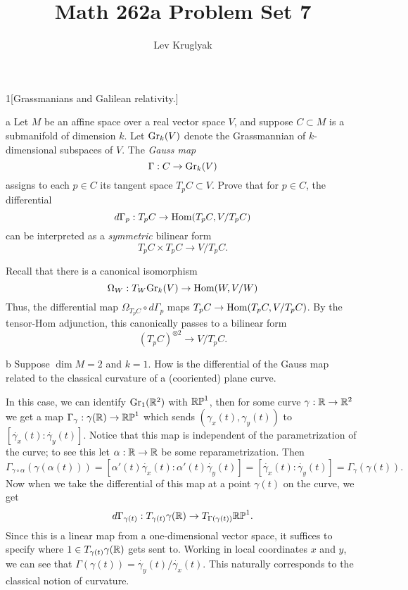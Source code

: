 \documentclass{pset}
\title{Math 262a Problem Set 7}
\author{Lev Kruglyak}
\begin{document}
\maketitle

\begin{problem}{1}[Grassmanians and Galilean relativity.]
\end{problem}

\begin{parts}
  \begin{part}{a}
    Let $M$ be an affine space over a real vector space $V$, and suppose $C\subset M$ is a submanifold of dimension $k$. Let $\textrm{Gr}_k(V)$ denote the Grassmannian of $k$-dimensional subspaces of $V$. The \emph{Gauss map}
    \[
      \Gamma : C \to \textrm{Gr}_k(V)
    \]
    assigns to each $p\in C$ its tangent space $T_pC \subset V$. Prove that for $p\in C$, the differential
    \[
      d\Gamma_p : T_p C \to \textrm{Hom}(T_p C, V/T_p C)
    \]
    can be interpreted as a \emph{symmetric} bilinear form
    \[
      T_p C \times T_p C \to V / T_p C.
    \]
  \end{part}

  Recall that there is a canonical isomorphism 
  \[
    \Omega_W : T_{W}\textrm{Gr}_k(V) \to \textrm{Hom}(W, V/W)
  \]
  Thus, the differential map $\Omega_{T_pC}\circ d\Gamma_p$ maps $T_p C \to \textrm{Hom}(T_p C, V/T_p C)$. By the tensor-Hom adjunction, this canonically passes to a bilinear form
  \[
    (T_p C)^{\otimes 2} \to V/T_p C.
  \]

  \begin{part}{b}
    Suppose $\dim M = 2$ and $k=1$. How is the differential of the Gauss map related to the classical curvature of a (cooriented) plane curve.
  \end{part}

  In this case, we can identify $\textrm{Gr}_1(\mathbb{R}^2)$ with $\mathbb{RP}^1$, then for some curve $\gamma : \mathbb{R} \to \mathbb{R}^2$ we get a map $\Gamma_\gamma : \gamma(\mathbb{R}) \to \mathbb{RP}^1$ which sends $(\gamma_x(t), \gamma_y(t))$ to $[\dot{\gamma_x}(t): \dot{\gamma_y}(t)]$. Notice that this map is independent of the parametrization of the curve; to see this let $\alpha : \mathbb{R} \to \mathbb{R}$ be some reparametrization. Then
  \[
    \Gamma_{\gamma\circ \alpha}(\gamma(\alpha(t))) = [\alpha'(t)\dot{\gamma_x}(t) : \alpha'(t)\dot{\gamma_y}(t)] = [\dot{\gamma_x}(t) : \dot{\gamma_y}(t)] = \Gamma_{\gamma}(\gamma(t)).
  \]
  Now when we take the differential of this map at a point $\gamma(t)$ on the curve, we get 
  \[
    d\Gamma_{\gamma(t)} : T_{\gamma(t)} \gamma(\mathbb{R}) \to T_{\Gamma(\gamma(t))}\mathbb{RP}^1.
  \]
  Since this is a linear map from a one-dimensional vector space, it suffices to specify where $1\in T_{\gamma(t)}\gamma(\mathbb{R})$ gets sent to. Working in local coordinates $x$ and $y$, we can see that $\Gamma(\gamma(t)) = \dot{\gamma_y}(t)/\dot{\gamma_x}(t).$ This naturally corresponds to the classical notion of curvature.
\end{parts}
\end{document}
